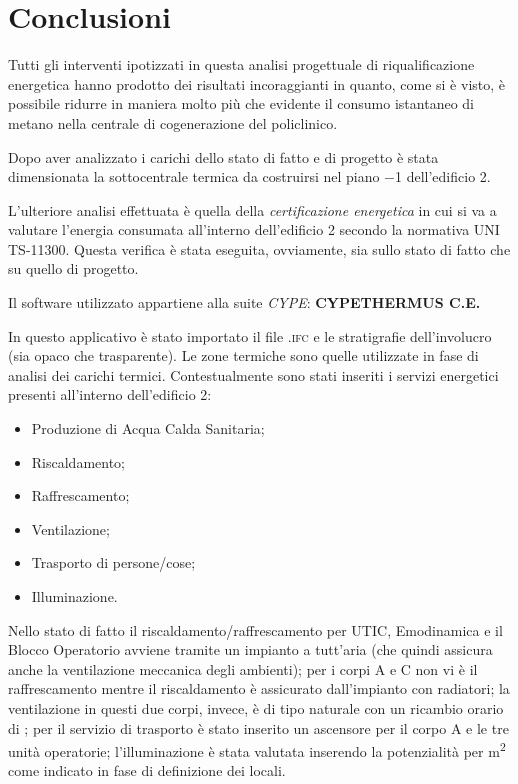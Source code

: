 \chapter{Conclusioni}
\thispagestyle{empty}
Tutti gli interventi ipotizzati in questa analisi progettuale di riqualificazione energetica hanno prodotto dei risultati incoraggianti in quanto, come si è visto, è possibile ridurre in maniera molto più che evidente il consumo istantaneo di metano nella centrale di cogenerazione del policlinico.

Dopo aver analizzato i carichi dello stato di fatto e di progetto è stata dimensionata la sottocentrale termica da costruirsi nel piano \num{-1} dell'edificio 2. 

L'ulteriore analisi effettuata è quella della \emph{certificazione energetica} in cui si va a valutare l'energia consumata all'interno dell'edificio 2 secondo la normativa UNI TS-11300. Questa verifica è stata eseguita, ovviamente, sia sullo stato di fatto che su quello di progetto.

Il software utilizzato appartiene alla suite \emph{CYPE}: \textbf{CYPETHERMUS C.E.}

In questo applicativo è stato importato il file \textsc{.ifc} e le stratigrafie dell'involucro (sia opaco che trasparente). Le zone termiche sono quelle utilizzate in fase di analisi dei carichi termici. Contestualmente sono stati inseriti i servizi energetici presenti all'interno dell'edificio 2:
\begin{itemize}
	\item Produzione di Acqua Calda Sanitaria;
	\item Riscaldamento;
	\item Raffrescamento;
	\item Ventilazione;
	\item Trasporto di persone/cose;
	\item Illuminazione.
\end{itemize}
Nello stato di fatto il riscaldamento/raffrescamento per UTIC, Emodinamica e il Blocco Operatorio avviene tramite un impianto a tutt'aria (che quindi assicura anche la ventilazione meccanica degli ambienti); per i corpi A e C non vi è il raffrescamento mentre il riscaldamento è assicurato dall'impianto con radiatori; la ventilazione in questi due corpi, invece, è di tipo naturale con un ricambio orario di ; per il servizio di trasporto è stato inserito un ascensore per il corpo A e le tre unità operatorie; l'illuminazione è stata valutata inserendo la potenzialità per \si{m^2} come indicato in fase di definizione dei locali.

